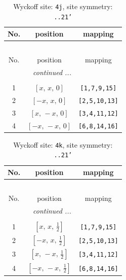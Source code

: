 \documentclass[fleqn,8pt]{jsarticle}
\begin{document}
\begin{longtable}{ccc}
\caption{Wyckoff site: {\tt 4j}, site symmetry: {\tt ..21'}}
 \\
 \hline \hline
No. & position & mapping \\ \hline \endfirsthead

\multicolumn{2}{l}{\tablename\ \thetable{}} \\
 \hline \hline
No. & position & mapping \\ \hline \endhead

 \hline \hline
\multicolumn{2}{r}{\footnotesize\it continued ...} \\ \endfoot

 \hline \hline
\multicolumn{2}{r}{} \\ \endlastfoot

1 & $\left[ x,\, x,\, 0 \right]$ & {\tt [1,7,9,15]} \\ \hline
2 & $\left[ - x,\, x,\, 0 \right]$ & {\tt [2,5,10,13]} \\ \hline
3 & $\left[ x,\, - x,\, 0 \right]$ & {\tt [3,4,11,12]} \\ \hline
4 & $\left[ - x,\, - x,\, 0 \right]$ & {\tt [6,8,14,16]} \\
\end{longtable}
\renewcommand{\arraystretch}{1.2}
\begin{longtable}{ccc}
\caption{Wyckoff site: {\tt 4k}, site symmetry: {\tt ..21'}}
 \\
 \hline \hline
No. & position & mapping \\ \hline \endfirsthead

\multicolumn{2}{l}{\tablename\ \thetable{}} \\
 \hline \hline
No. & position & mapping \\ \hline \endhead

 \hline \hline
\multicolumn{2}{r}{\footnotesize\it continued ...} \\ \endfoot

 \hline \hline
\multicolumn{2}{r}{} \\ \endlastfoot

1 & $\left[ x,\, x,\, \frac{1}{2} \right]$ & {\tt [1,7,9,15]} \\ \hline
2 & $\left[ - x,\, x,\, \frac{1}{2} \right]$ & {\tt [2,5,10,13]} \\ \hline
3 & $\left[ x,\, - x,\, \frac{1}{2} \right]$ & {\tt [3,4,11,12]} \\ \hline
4 & $\left[ - x,\, - x,\, \frac{1}{2} \right]$ & {\tt [6,8,14,16]} \\
\end{longtable}
\end{document}
